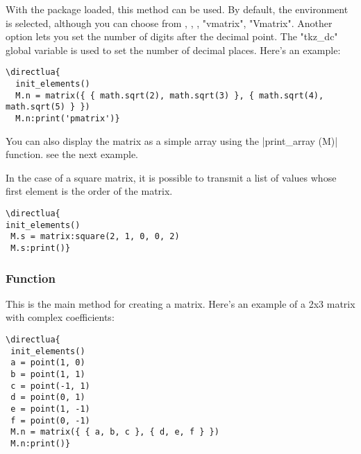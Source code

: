 With the  package loaded, this method can be used. By default, the  environment is selected, although you can choose from , , , "vmatrix", "Vmatrix". Another option lets you set the number of digits after the decimal point. The "tkz\_dc" global variable is used to set the number of decimal places. Here's an example:

\vspace{.5em}
\begin{verbatim}
\directlua{
  init_elements()
  M.n = matrix({ { math.sqrt(2), math.sqrt(3) }, { math.sqrt(4), math.sqrt(5) } })
  M.n:print('pmatrix')}
\end{verbatim}



\vspace{.5em}
You can also display the matrix as a simple array using the |print_array (M)| function. see  the next example.

In the case of a square matrix, it is possible to transmit a list of values whose first element is the order of the matrix.

\vspace{.5em}
\begin{minipage}{.5\textwidth}
\begin{verbatim}
\directlua{
init_elements()
 M.s = matrix:square(2, 1, 0, 0, 2)
 M.s:print()}
  \end{verbatim}
\end{minipage}
\begin{minipage}{.5\textwidth}
\end{minipage}


\subsubsection{Function } %
\label{ssub:method_new}

This is the main method for creating a matrix. Here's an example of a 2x3 matrix with complex coefficients:

\vspace{.5em}
\begin{minipage}{.5\textwidth}
\begin{verbatim}
\directlua{
 init_elements()
 a = point(1, 0)
 b = point(1, 1)
 c = point(-1, 1)
 d = point(0, 1)
 e = point(1, -1)
 f = point(0, -1)
 M.n = matrix({ { a, b, c }, { d, e, f } })
 M.n:print()}
\end{verbatim}
\end{minipage}
\begin{minipage}{.5\textwidth}
\end{minipage}


